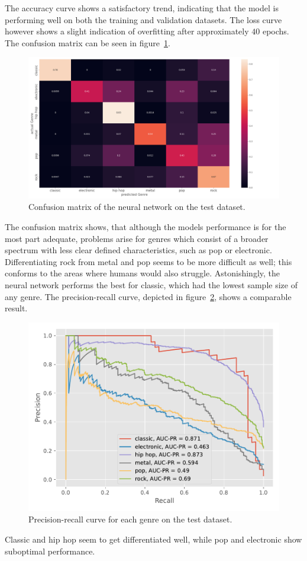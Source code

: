 \documentclass[
  12pt,
  bibliography=totoc,     %
  captions=tableheading,  %
  titlepage=firstiscover, %
]{scrartcl}
\begin{document}
\noindent
The accuracy curve shows a satisfactory trend, indicating that the model is performing well on both the training and validation datasets. The loss curve however
shows a slight indication of overfitting after approximately $40$ epochs.
The confusion matrix can be seen in figure~\ref{fig:nn_confusion}.
\begin{figure}[H]
  \centering
  \includegraphics[scale=0.4]{figures/NN/confusion_matrix_nn.png}
  \caption{Confusion matrix of the neural network on the test dataset.}
  \label{fig:nn_confusion}
\end{figure}
\noindent
The confusion matrix shows, that although the models performance is for the most part adequate, problems arise for genres which consist of a broader spectrum with less clear
defined characteristics, such as pop or electronic. Differentiating rock from metal and pop seems to be more difficult as well; this conforms to the areas where humans would
also struggle. Astonishingly, the neural network performs the best for classic, which had the lowest sample size of any genre.
The precision-recall curve, depicted in figure~\ref{fig:pr_curve_nn}, shows a comparable result.
\begin{figure}[H]
  \centering
  \includegraphics[scale=0.56]{figures/NN/PR_curve_genres.pdf}
  \caption{Precision-recall curve for each genre on the test dataset.}
  \label{fig:pr_curve_nn}
\end{figure}
\noindent
Classic and hip hop seem to get differentiated well, while pop and electronic show suboptimal performance.
\end{document}
